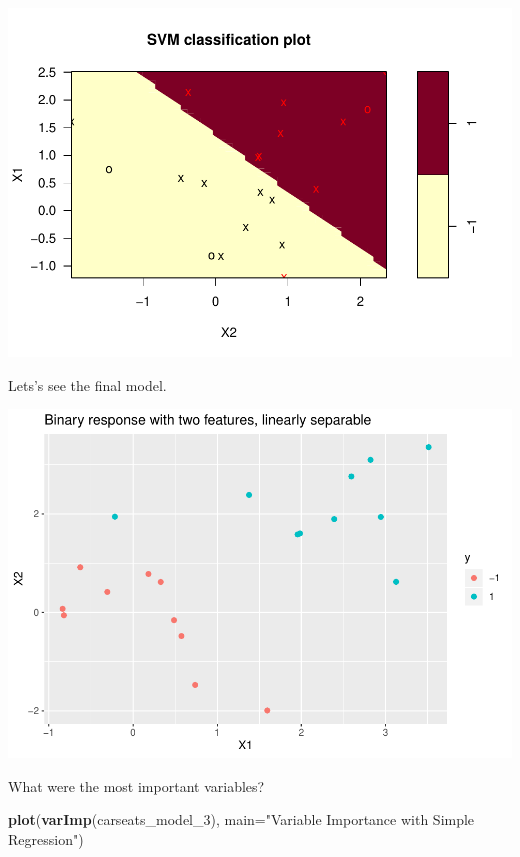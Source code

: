 \documentclass[
]{book}
\newenvironment{Shaded}{\begin{snugshade}}{\end{snugshade}}
\newcommand{\DataTypeTok}[1]{\textcolor[rgb]{0.13,0.29,0.53}{#1}}
\newcommand{\DecValTok}[1]{\textcolor[rgb]{0.00,0.00,0.81}{#1}}
\newcommand{\KeywordTok}[1]{\textcolor[rgb]{0.13,0.29,0.53}{\textbf{#1}}}
\newcommand{\NormalTok}[1]{#1}
\newcommand{\OperatorTok}[1]{\textcolor[rgb]{0.81,0.36,0.00}{\textbf{#1}}}
\newcommand{\StringTok}[1]{\textcolor[rgb]{0.31,0.60,0.02}{#1}}
\begin{document}
\includegraphics{data-sci_files/figure-latex/unnamed-chunk-99-1.pdf}

Lets's see the final model.

\begin{Shaded}
\end{Shaded}

\includegraphics{data-sci_files/figure-latex/unnamed-chunk-100-1.pdf}

What were the most important variables?

\begin{Shaded}
\begin{Highlighting}[]
\KeywordTok{plot}\NormalTok{(}\KeywordTok{varImp}\NormalTok{(carseats_model_}\DecValTok{3}\NormalTok{), }\DataTypeTok{main=}\StringTok{"Variable Importance with Simple Regression"}\NormalTok{)}
\end{Highlighting}
\end{Shaded}
\end{document}
